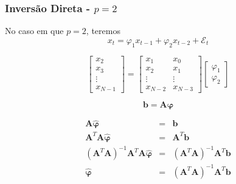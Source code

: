 \begin{frame}[allowframebreaks]
  \frametitle{Inversão Direta - $p=2$}
  No caso em que $p=2$, teremos
  \begin{equation}
        x_{t} = \varphi_1 x_{t-1} + \varphi_2 x_{t-2} + \mathcal{E}_t
  \end{equation}
  
  \begin{equation}
  \begin{bmatrix} x_2 \\ x_3 \\ \vdots \\ x_{N-1}\end{bmatrix}
  = \begin{bmatrix} x_1 & x_0 \\ x_2 & x_1 \\ \vdots & \vdots \\ x_{N-2} & x_{N-3}\end{bmatrix} \begin{bmatrix}\varphi_1 \\ \varphi_2\end{bmatrix} 
  \end{equation}
  
  \begin{equation}
  \mathbf{b} = \mathbf{A} \mathbf{\varphi}
  \end{equation}
  
  \begin{eqnarray}
  \mathbf{A} \hat{\mathbf{\varphi}} &=& \mathbf{b} \nonumber \\
  \mathbf{A}^T \mathbf{A} \hat{\mathbf{\varphi}} &=& \mathbf{A}^T \mathbf{b} \nonumber \\
  (\mathbf{A}^T \mathbf{A})^{-1} \mathbf{A}^T \mathbf{A} \hat{\mathbf{\varphi}} &=& (\mathbf{A}^T \mathbf{A})^{-1} \mathbf{A}^T \mathbf{b} \nonumber \\
  \hat{\mathbf{\varphi}} &=& (\mathbf{A}^T \mathbf{A})^{-1} \mathbf{A}^T \mathbf{b} 
  \end{eqnarray}
  

\end{frame}
